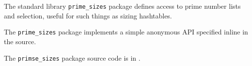 
The standard library {\tt prime\_sizes} package defines access to prime number lists and 
selection, useful for such things as sizing hashtables.

The {\tt prime\_sizes} package implements a simple anonymous API specified inline in the source.

The {\tt primse\_sizes} package source code is in .

